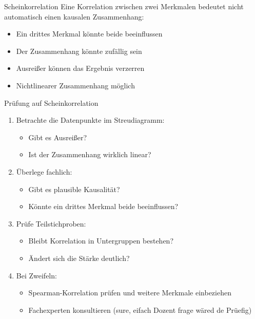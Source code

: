 \begin{definition}{Scheinkorrelation}
Eine Korrelation zwischen zwei Merkmalen bedeutet nicht automatisch einen kausalen Zusammenhang:
\begin{itemize}
    \item Ein drittes Merkmal könnte beide beeinflussen
    \item Der Zusammenhang könnte zufällig sein
    \item Ausreißer können das Ergebnis verzerren
    \item Nichtlinearer Zusammenhang möglich
\end{itemize}
\end{definition}

\begin{KR}{Prüfung auf Scheinkorrelation}
\begin{enumerate}
    \item Betrachte die Datenpunkte im Streudiagramm:
        \begin{itemize}
            \item Gibt es Ausreißer?
            \item Ist der Zusammenhang wirklich linear?
        \end{itemize}
    \item Überlege fachlich:
        \begin{itemize}
            \item Gibt es plausible Kausalität?
            \item Könnte ein drittes Merkmal beide beeinflussen?
        \end{itemize}
    \item Prüfe Teilstichproben:
        \begin{itemize}
            \item Bleibt Korrelation in Untergruppen bestehen?
            \item Ändert sich die Stärke deutlich?
        \end{itemize}
    \item Bei Zweifeln:
        \begin{itemize}
            \item Spearman-Korrelation prüfen und weitere Merkmale einbeziehen
            \item Fachexperten konsultieren (sure, eifach Dozent frage wäred de Prüefig)
        \end{itemize}
\end{enumerate}
\end{KR}

\columnbreak




